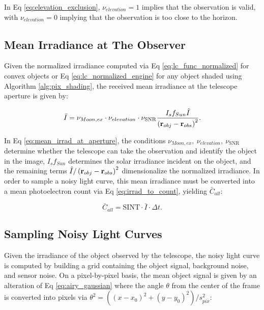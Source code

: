 In Eq \ref{eq:elevation_exclusion}, $\nu_{elevation} = 1$ implies that the observation is valid, with $\nu_{elevation} = 0$ implying that the observation is too close to the horizon.

\subsection{Mean Irradiance at The Observer}

Given the normalized irradiance computed via Eq \ref{eq:lc_func_normalized} for convex objects or Eq \ref{eq:lc_normalized_engine} for any object shaded using Algorithm \ref{alg:pix_shading}, the received mean irradiance at the telescope aperture is given by:

\begin{equation} \label{eq:mean_irrad_at_aperture}
  \bar{I} = \nu_{Moon,ex} \cdot \nu_{elevation} \cdot \nu_{\mathrm{SNR}} \frac{I_s f_{Sun} \hat{I}}{\left( \mathbf{r}_{obj} - \mathbf{r}_{obs} \right)^2}.
\end{equation}

In Eq \ref{eq:mean_irrad_at_aperture}, the conditions $\nu_{Moon,ex},\: \nu_{elevation},\: \nu_{\mathrm{SNR}}$ determine whether the telescope can take the observation and identify the object in the image, $I_s f_{Sun}$ determines the solar irradiance incident on the object, and the remaining terms $\hat{I} / \left( \mathbf{r}_{obj} - \mathbf{r}_{obs} \right)^2$ dimensionalize the normalized irradiance. In order to sample a noisy light curve, this mean irradiance must be converted into a mean photoelectron count via Eq \ref{eq:irrad_to_count}, yielding $\bar{C}_{all}$:

\begin{equation}
  \bar{C}_{all} = \textrm{SINT} \cdot \bar{I} \cdot \Delta t.
\end{equation}

\subsection{Sampling Noisy Light Curves} \label{sec:sampling_lcs}

Given the irradiance of the object observed by the telescope, the noisy light curve is computed by building a grid containing the object signal, background noise, and sensor noise. On a pixel-by-pixel basis, the mean object signal is given by an alteration of Eq \ref{eq:airy_gaussian} where the angle $\theta$ from the center of the frame is converted into pixels via $\theta^2 = \left((x - x_0)^2 + (y - y_0)^2 \right) / s_{pix}^2$:


